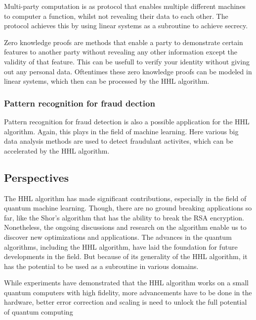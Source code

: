     Multi-party computation is as protocol that enables multiple different machines to computer a function, whilst not revealing their data to each other. 
    The protocol achieves this by using linear systems as a subroutine to achieve secrecy.

    Zero knowledge proofs are methods that enable a party to demonstrate certain features to another party without revealing any other information except the validity of that feature.
    This can be usefull to verify your identity without giving out any personal data.
    Oftentimes these zero knowledge proofs can be modeled in linear systems, which then can be processed by the HHL algorithm.

    \subsubsection{Pattern recognition for fraud dection}
    Pattern recognition for fraud detection is also a possible application for the HHL algorithm.
    Again, this plays in the field of machine learning. 
    Here various big data analysis methods are used to detect fraudulant activites, which can be accelerated by the HHL algorithm.

\subsection{Perspectives}
The HHL algorithm has made significant contributions, especially in the field of quantum machine learning. 
Though, there are no ground breaking applications so far, like the Shor's algorithm that has the ability to break the RSA encryption.
Nonetheless, the ongoing discussions and research on the algorithm enable us to discover new optimizations and applications.
The advances in the quantum algorithms, including the HHL algorithm, have laid the foundation for future developments in the field.
But because of its generality of the HHL algorithm, it has the potential to be used as a subroutine in various domains.

While experiments have demonstrated that the HHL algorithm works on a small quantum computers with high fidelity, 
more advancements have to be done in the hardware, better error correction and scaling is need to unlock the full potential of quantum computing









